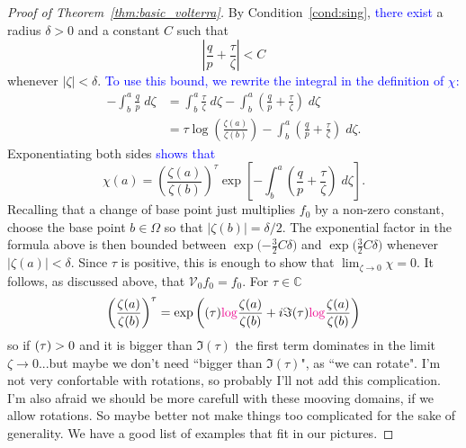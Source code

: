 \documentclass[review]{siamart220329}
\newcommand{\C}{\mathbb{C}}
\let\Re\relax
\DeclareMathOperator{\Re}{Re}
\newcommand{\hardpart}{\mathcal{V}_0}
\newcommand{\solproto}{f_0}
\begin{document}
\begin{proof}[Proof of Theorem~\ref{thm:basic_volterra}]
By Condition~\eqref{cond:sing}, \textcolor{blue}{there exist} a radius $\delta>0$ and a constant $C$ such that
\begin{equation}\label{eqn:sing-bound}
\left|\frac{q}{p} + \frac{\tau}{\zeta}\right| < C
\end{equation}
whenever $|\zeta| < \delta$. \textcolor{blue}{To use this bound, we rewrite the integral in the definition of $\chi$:}
\begin{align*}
-\int_b^a \frac{q}{p}\;d\zeta & = \int_b^a \frac{\tau}{\zeta}\;d\zeta - \int_b^a \left( \frac{q}{p} + \frac{\tau}{\zeta} \right)\;d\zeta \\
& = \tau \log\left(\frac{\zeta(a)}{\zeta(b)}\right) - \int_b^a \left( \frac{q}{p} + \frac{\tau}{\zeta} \right)\;d\zeta.
\end{align*}
Exponentiating both sides \textcolor{blue}{shows that}
\[ \chi(a) = \left(\frac{\zeta(a)}{\zeta(b)}\right)^\tau \exp\left[-\int_b^a \left( \frac{q}{p} + \frac{\tau}{\zeta} \right)\;d\zeta\right]. \]
Recalling that a change of base point just multiplies $\solproto$ by a non-zero constant, choose the base point $b \in \Omega$ so that $|\zeta(b)| = \delta/2$. The exponential factor in the formula above is then bounded between $\exp\big({-\tfrac{3}{2}C\delta}\big)$ and $\exp\big(\tfrac{3}{2}C\delta\big)$ whenever $|\zeta(a)| < \delta$. Since $\tau$ is positive, this is enough to show that $\lim_{\zeta \to 0} \chi = 0$. It follows, as discussed above, that $\hardpart \solproto = \solproto$. 
\color{orange}
For $\tau\in\C$
\begin{equation}
    \left(\frac{\zeta(a)}{\zeta(b)}\right)^\tau=\exp\left(\Re(\tau) \textcolor{magenta}{\log} \frac{\zeta(a)}{\zeta(b)}+i\Im(\tau)\textcolor{magenta}{\log} \frac{\zeta(a)}{\zeta(b)}\right)
\end{equation}
so if $\Re(\tau)>0$ and it is bigger than $\Im(\tau)$ the first term dominates in the limit $\zeta\to0$...but maybe we don't need ``bigger than $\Im(\tau)$", as ``we can rotate". I'm not very confortable with rotations, so probably I'll not add this complication. I'm also afraid we should be more carefull with these mooving domains, if we allow rotations. So maybe better not make things too complicated for the sake of generality. We have a good list of examples that fit in our pictures. 
\color{black}
\end{proof}
\end{document}

